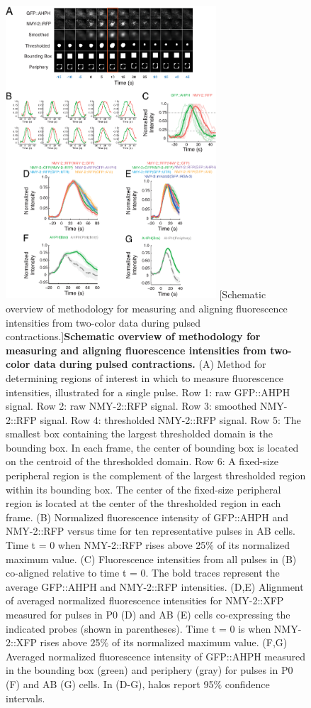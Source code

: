 \documentclass{ucetd}
\begin{document}
{{{{%
\begin{figure}[!htbp]
\centering
\includegraphics[width=0.7\textwidth]{Figure2-12}
[Schematic overview of methodology for measuring and aligning fluorescence intensities from two-color data during pulsed contractions.]{\textbf{Schematic overview of methodology for measuring and aligning fluorescence intensities from two-color data during pulsed contractions.} (A) Method for determining regions of interest in which to measure fluorescence intensities, illustrated for a single pulse.  Row 1:  raw GFP::AHPH signal. Row 2: raw NMY-2::RFP signal.  Row 3: smoothed NMY-2::RFP signal. Row 4: thresholded NMY-2::RFP signal. Row 5: The smallest box containing the largest thresholded domain is the bounding box.  In each frame, the center of bounding box is located on the centroid of the thresholded domain. Row 6: A fixed-size peripheral region is the complement of the largest thresholded region within its bounding box.      The center of the fixed-size peripheral region is located at the center of the thresholded region in each frame.  (B) Normalized fluorescence intensity of GFP::AHPH and NMY-2::RFP versus time for ten representative pulses in AB cells. Time t = 0 when NMY-2::RFP rises above 25$\%$ of its normalized maximum value. (C) Fluorescence intensities from all pulses in (B) co-aligned relative to time t = 0. The bold traces represent the average GFP::AHPH and NMY-2::RFP intensities. (D,E) Alignment of averaged normalized fluorescence intensities for NMY-2::XFP measured for pulses in P0 (D) and AB (E) cells co-expressing the indicated probes (shown in parentheses). Time t = 0 is when NMY-2::XFP rises above 25$\%$ of its normalized maximum value. (F,G) Averaged normalized fluorescence intensity of GFP::AHPH measured in the bounding box (green) and periphery (gray) for pulses in P0 (F) and AB (G) cells.  In (D-G), halos report 95$\%$ confidence intervals.}

\end{figure}}}}}
\end{document}
